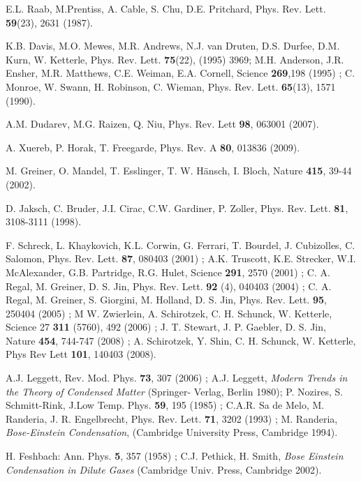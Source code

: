 \documentclass[aps,pra,floats,epsfig,pdflatex]{revtex4}                                                              %
\begin{document}
\begin{thebibliography}{}

E.L. Raab, M.Prentiss, A. Cable, S. Chu, D.E. Pritchard, {Phys. Rev. Lett.} \textbf{59}(23), 2631 (1987).

K.B. Davis, M.O. Mewes, M.R. Andrews, N.J. {van Druten}, D.S. Durfee,  D.M. Kurn, W. Ketterle, {Phys. Rev. Lett.} \textbf{75}(22), (1995) 3969; M.H. Anderson, J.R. Ensher, M.R. Matthews, C.E. Weiman, E.A. Cornell, {Science} \textbf{269},198 (1995)  ; C. Monroe, W. Swann, H. Robinson, C. Wieman, {Phys. Rev. Lett.} \textbf{65}(13), 1571 (1990).

A.M. Dudarev, M.G. Raizen, Q. Niu, Phys. Rev. Lett \textbf{98}, 063001 (2007).

A. Xuereb, P. Horak, T. Freegarde, Phys. Rev. A \textbf{80}, 013836 (2009).

M. Greiner, O. Mandel, T. Esslinger, T. W. H\"ansch, I. Bloch, Nature \textbf{415}, 39-44 (2002).

D. Jaksch, C. Bruder, J.I. Cirac, C.W. Gardiner, P. Zoller, Phys. Rev. Lett. \textbf{81}, 3108-3111 (1998).

F. Schreck, L. Khaykovich, K.L. Corwin, G. Ferrari, T. Bourdel, J. Cubizolles, C. Salomon, Phys. Rev. Lett. \textbf{87}, 080403 (2001) ; A.K. Truscott, K.E. Strecker, W.I. McAlexander, G.B. Partridge, R.G. Hulet, Science \textbf{291}, 2570 (2001) ; C. A. Regal, M. Greiner, D. S. Jin, Phys. Rev. Lett. \textbf{92} (4), 040403 (2004)  ; C. A. Regal, M. Greiner, S. Giorgini, M. Holland, D. S. Jin, Phys. Rev. Lett.  \textbf{95}, 250404 (2005)  ; M W. Zwierlein, A. Schirotzek, C. H. Schunck, W. Ketterle, Science {27}  \textbf{311} (5760), 492 (2006) ; J. T. Stewart, J. P. Gaebler, D. S. Jin, Nature \textbf{454}, 744-747 (2008)  ; A. Schirotzek, Y. Shin, C. H. Schunck, W. Ketterle, Phys Rev Lett \textbf{101}, 140403 (2008).

A.J. Leggett, Rev. Mod. Phys. {\bf 73}, 307 (2006) ; A.J. Leggett, \textit{Modern Trends in the Theory of Condensed Matter} (Springer- Verlag, Berlin 1980); P. Nozires, S. Schmitt-Rink, J.Low Temp. Phys. \textbf{59}, 195 (1985) ; C.A.R. Sa de Melo, M. Randeria, J. R. Engelbrecht, Phys. Rev. Lett. \textbf{71}, 3202 (1993) ; M. Randeria, \textit{Bose-Einstein Condensation}, (Cambridge University Press, Cambridge 1994).

H. Feshbach: Ann. Phys. \textbf{5}, 357 (1958) ; C.J. Pethick, H. Smith, \textit{Bose Einstein Condensation in Dilute Gases} (Cambridge Univ. Press, Cambridge 2002).


\end{thebibliography}
\end{document}
